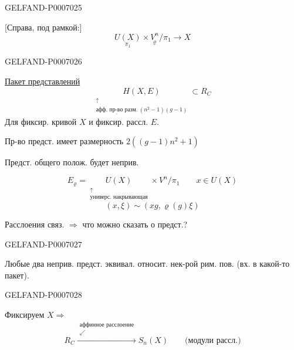 \begin{GelfandAdjacentEvidence}{GELFAND-P000702}{5}


[Справа, под рамкой:]
\[
\underset{\pi_1}{U(X)}\times\underset{\varrho}{V^n}/\pi_1\longrightarrow X
\]
\end{GelfandAdjacentEvidence}
\begin{GelfandAdjacentEvidence}{GELFAND-P000702}{6}


\underline{Пакет представлений}
\[
\underset{\substack{\uparrow\\\underline{\text{афф. пр-во разм.}}\ (n^2-1)(g-1)}}{H(X,E)}
\subset R_C
\]
Для фиксир. кривой \(X\) и фиксир. рассл. \(E\).

Пр-во предст. имеет размерность \(2((g-1)n^2+1)\)

Предст. общего полож. будет неприв.

\[
E_{\varrho}=\underset{\substack{\uparrow\\\text{универс. накрывающая}}}{U(X)}\times V^n/\pi_1
\qquad x\in U(X)
\]
\[
(x,\xi)\sim(xg,\varrho(g)\xi)
\]

Расслоения связ. \(\Rightarrow\) что можно сказать о предст.?

\end{GelfandAdjacentEvidence}
\begin{GelfandAdjacentEvidence}{GELFAND-P000702}{7}


Любые два неприв. предст. эквивал. относит. нек-рой рим. пов. (вх. в какой-то пакет).

\end{GelfandAdjacentEvidence}
\begin{GelfandAdjacentEvidence}{GELFAND-P000702}{8}

\end{GelfandAdjacentEvidence}


Фиксируем \(X\Rightarrow\)
\[
R_C\overset{\substack{\text{аффинное расслоение}\\\swarrow}}{\longrightarrow}S_n(X)
\qquad\text{(модули рассл.)}
\]



